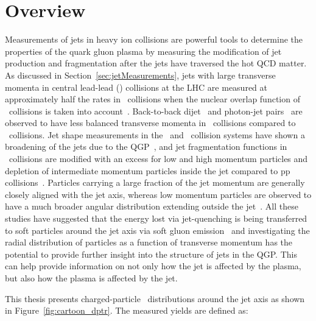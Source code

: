
\section{Overview}

Measurements of jets in heavy ion collisions are powerful tools to determine the properties of the quark gluon plasma by measuring the modification of jet production and fragmentation after the jets have traversed the hot QCD matter.
As discussed in Section~\ref{sec:jetMeasurements}, jets with large transverse momenta in central lead-lead (\pbpb) collisions at the LHC are measured at approximately half the rates in \pp\ collisions when the nuclear overlap function of \pbpb\ collisions is taken into account~\cite{Abelev:2013kqa,Aad:2014bxa,Adam:2015ewa,Khachatryan:2016jfl, Khachatryan:2016odn, 2019108}.
Back-to-back dijet~\cite{Aad:2010bu,Chatrchyan:2011sx,Aaboud:2017eww} and photon-jet pairs~\cite{Chatrchyan:2012gt,2019167} are observed to have less balanced transverse momenta in \pbpb\ collisions compared to \pp\ collisions.
Jet shape measurements in the \pp\ and \pbpb\ collision systems have shown a broadening of the jets due to the QGP~\cite{Aad:2011sc, Acharya:2018uvf, Chatrchyan:2012mec, Chatrchyan:2013kwa}, and jet fragmentation functions in \pbpb\ collisions are modified with an excess for low and high momentum particles and depletion of intermediate momentum particles inside the jet compared to pp collisions~\cite{Aad:2014wha,Chatrchyan:2014ava,Aaboud:2017bzv,PhysRevC.98.024908}.
Particles carrying a large fraction of the jet momentum are generally closely aligned with the jet axis, whereas low momentum particles are observed to have a much broader angular distribution extending outside the jet~\cite{Chatrchyan:2011sx,Khachatryan2016,Khachatryan:2016tfj,Sirunyan:2018jqr}.
All these studies have suggested that the energy lost via jet-quenching is being transferred to soft particles around the jet axis via soft gluon emission~\cite{Vitev:2008rz,Ovanesyan:2011xy,Blaizot:2014ula,Qin:2015srf,Escobedo:2016jbm,Casalderrey-Solana:2016jvj,Tachibana:2017syd} and investigating the radial distribution of particles as a function of transverse momentum has the potential to provide further insight into the structure of jets in the QGP.
This can help provide information on not only how the jet is affected by the plasma, but also how the plasma is affected by the jet.

This thesis presents charged-particle \pt\ distributions around the jet axis as shown in Figure~\ref{fig:cartoon_dptr}. 
The measured yields are defined as:

